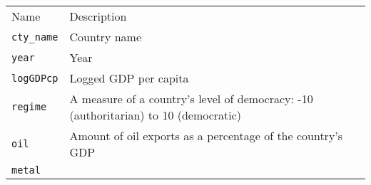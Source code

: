 \documentclass[]{article}
\begin{document}
\begin{longtable}[c]{@{}ll@{}}
\toprule\addlinespace
\begin{minipage}[b]{0.25\columnwidth}\raggedright
Name
\end{minipage} & \begin{minipage}[b]{0.68\columnwidth}\raggedright
Description
\end{minipage}
\\\addlinespace
\midrule\endhead
\begin{minipage}[t]{0.25\columnwidth}\raggedright
\texttt{cty\_name}
\end{minipage} & \begin{minipage}[t]{0.68\columnwidth}\raggedright
Country name
\end{minipage}
\\\addlinespace
\begin{minipage}[t]{0.25\columnwidth}\raggedright
\texttt{year}
\end{minipage} & \begin{minipage}[t]{0.68\columnwidth}\raggedright
Year
\end{minipage}
\\\addlinespace
\begin{minipage}[t]{0.25\columnwidth}\raggedright
\texttt{logGDPcp}
\end{minipage} & \begin{minipage}[t]{0.68\columnwidth}\raggedright
Logged GDP per capita
\end{minipage}
\\\addlinespace
\begin{minipage}[t]{0.25\columnwidth}\raggedright
\texttt{regime}
\end{minipage} & \begin{minipage}[t]{0.68\columnwidth}\raggedright
A measure of a country's level of democracy: -10 (authoritarian) to 10
(democratic)
\end{minipage}
\\\addlinespace
\begin{minipage}[t]{0.25\columnwidth}\raggedright
\texttt{oil}
\end{minipage} & \begin{minipage}[t]{0.68\columnwidth}\raggedright
Amount of oil exports as a percentage of the country's GDP
\end{minipage}
\\\addlinespace
\begin{minipage}[t]{0.25\columnwidth}\raggedright
\texttt{metal}
\end{minipage} & \begin{minipage}[t]{0.68\columnwidth}\raggedright

\end{minipage}
\end{longtable}
\end{document}
